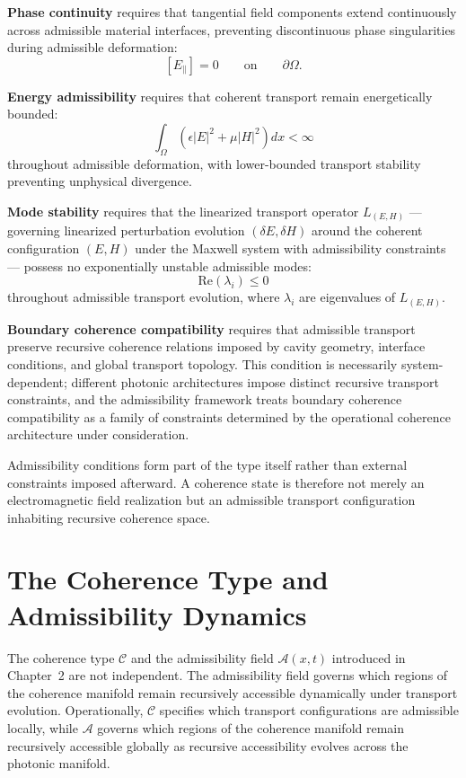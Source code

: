 \documentclass[11pt,openany]{book}
\theoremstyle{definition}
\theoremstyle{plain}
\newcommand{\Afield}{\mathcal{A}}
\begin{document}
\textbf{Phase continuity} requires that tangential field components extend continuously across admissible material interfaces, preventing discontinuous phase singularities during admissible deformation:
\[
[E_{\parallel}] = 0
\qquad
\text{on}
\qquad
\partial\Omega.
\]

\textbf{Energy admissibility} requires that coherent transport remain energetically bounded:
\[
\int_\Omega
\left(
\epsilon |E|^2
+
\mu |H|^2
\right)
dx
<
\infty
\]
throughout admissible deformation, with lower-bounded transport stability preventing unphysical divergence.

\textbf{Mode stability} requires that the linearized transport operator $L_{(E,H)}$ --- governing linearized perturbation evolution $(\delta E, \delta H)$ around the coherent configuration $(E,H)$ under the Maxwell system with admissibility constraints --- possess no exponentially unstable admissible modes:
\[
\mathrm{Re}(\lambda_i)
\leq
0
\]
throughout admissible transport evolution, where $\lambda_i$ are eigenvalues of $L_{(E,H)}$.

\textbf{Boundary coherence compatibility} requires that admissible transport preserve recursive coherence relations imposed by cavity geometry, interface conditions, and global transport topology. This condition is necessarily system-dependent; different photonic architectures impose distinct recursive transport constraints, and the admissibility framework treats boundary coherence compatibility as a family of constraints determined by the operational coherence architecture under consideration.

Admissibility conditions form part of the type itself rather than external constraints imposed afterward. A coherence state is therefore not merely an electromagnetic field realization but an admissible transport configuration inhabiting recursive coherence space.

\section{The Coherence Type and Admissibility Dynamics}

The coherence type $\mathcal{C}$ and the admissibility field $\Afield(x,t)$ introduced in Chapter~2 are not independent. The admissibility field governs which regions of the coherence manifold remain recursively accessible dynamically under transport evolution. Operationally, $\mathcal{C}$ specifies which transport configurations are admissible locally, while $\Afield$ governs which regions of the coherence manifold remain recursively accessible globally as recursive accessibility evolves across the photonic manifold.
\end{document}
